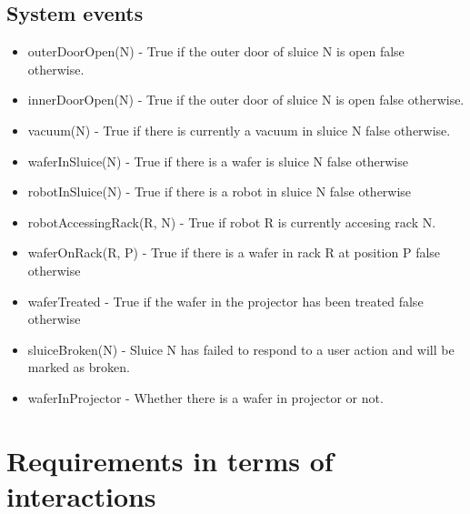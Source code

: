 \documentclass[12pt]{report}
\begin{document}
	\section{System events}
	\begin{itemize}
\item outerDoorOpen(N) - True if the outer door of sluice N is open false otherwise.
\item innerDoorOpen(N) - True if the outer door of sluice N is open false otherwise.
\item vacuum(N) - True if there is currently a vacuum in sluice N false otherwise.
\item waferInSluice(N) - True if there is a wafer is sluice N false otherwise
\item robotInSluice(N) - True if there is a robot in sluice N false otherwise
\item robotAccessingRack(R, N) -  True if robot R is currently accesing rack N.
\item waferOnRack(R, P) - True if there is a wafer in rack R at position P false otherwise
\item waferTreated - True if the wafer in the projector has been treated false otherwise
\item sluiceBroken(N) - Sluice N has failed to respond to a user action and will be marked as broken.
\item waferInProjector - Whether there is a wafer in projector or not.
	\end{itemize}
	
	\chapter{Requirements in terms of interactions}
\end{document}
